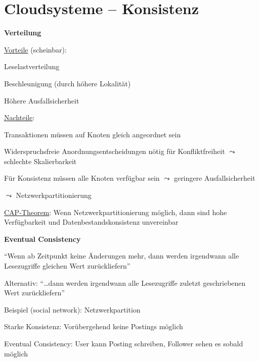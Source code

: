 \section{Cloudsysteme -- Konsistenz}
\label{sec:cloudkonsistenz}

\textbf{Verteilung}
\begin{items}
	\item \underline{Vorteile} (scheinbar):
	\begin{enumeration}
		\item Leselastverteilung
		\item Beschleunigung (durch höhere Lokalität)
		\item Höhere Ausfallsicherheit
	\end{enumeration}
	\item \underline{Nachteile}:
	\begin{enumeration}
		\item Transaktionen müssen auf Knoten gleich angeordnet sein
		\item Widerspruchsfreie Anordnungsentscheidungen nötig für Konfliktfreiheit \( \leadsto \) schlechte Skalierbarkeit
		\item Für Konsistenz müssen alle Knoten verfügbar sein \( \leadsto \) geringere Ausfallsicherheit
	\end{enumeration}
	\item \( \leadsto \) Netzwerkpartitionierung
	\item \underline{CAP-Theorem}: Wenn Netzwerkpartitionierung möglich, dann sind hohe Verfügbarkeit und Datenbestandskonsistenz unvereinbar
\end{items}

\textbf{Eventual Consistency}
\begin{items}
	\item ``Wenn ab Zeitpunkt keine Änderungen mehr, dann werden irgendwann alle Lesezugriffe gleichen Wert zurückliefern''
	\item Alternativ: ``\dots dann werden irgendwann alle Lesezugriffe zuletzt geschriebenen Wert zurückliefern''
	\item Beispiel (social network): Netzwerkpartition
	\begin{items}
		\item Starke Konsistenz: Vorübergehend keine Postings möglich
		\item Eventual Consistency: User kann Posting schreiben, Follower sehen es sobald möglich
	\end{items}
\end{items}

